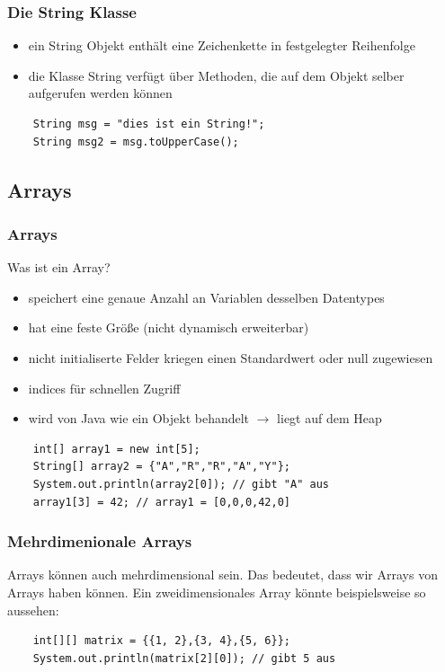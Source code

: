 \begin{frame}[fragile]
\frametitle{Die String Klasse}
\begin{itemize}
    \item ein String Objekt enthält eine Zeichenkette in festgelegter Reihenfolge
    \item die Klasse String verfügt über Methoden, die auf dem Objekt selber aufgerufen werden können
\end{itemize}
\begin{lstlisting}
    String msg = "dies ist ein String!";
    String msg2 = msg.toUpperCase();
\end{lstlisting}
\end{frame}

\subsection{Arrays}
\begin{frame}[fragile]
\frametitle{Arrays}
Was ist ein Array?
\begin{itemize}
    \item speichert eine genaue Anzahl an Variablen desselben Datentypes
    \item hat eine feste Größe (nicht dynamisch erweiterbar)
    \item nicht initialiserte Felder kriegen einen Standardwert oder null zugewiesen
    \item indices für schnellen Zugriff
    \item wird von Java wie ein Objekt behandelt $\rightarrow$ liegt auf dem Heap
\end{itemize}
\begin{lstlisting}
    int[] array1 = new int[5];
    String[] array2 = {"A","R","R","A","Y"};
    System.out.println(array2[0]); // gibt "A" aus
    array1[3] = 42; // array1 = [0,0,0,42,0]
\end{lstlisting}
\end{frame}

\begin{frame}[fragile]
\frametitle{Mehrdimenionale Arrays}
Arrays können auch mehrdimensional sein. Das bedeutet, dass wir Arrays von Arrays haben können. Ein zweidimensionales Array könnte beispielsweise so aussehen:
\begin{lstlisting}
    int[][] matrix = {{1, 2},{3, 4},{5, 6}};
    System.out.println(matrix[2][0]); // gibt 5 aus

\end{lstlisting}
\end{frame}
